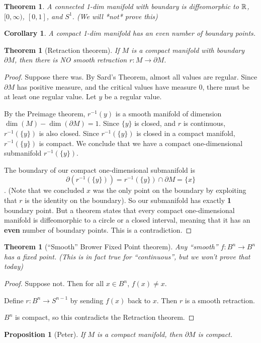 \documentclass[11pt]{amsbook}
\theoremstyle{mystyle} \newtheorem{thrm}[thm]{Theorem}
\theoremstyle{mystyle} \newtheorem{defi}[thm]{Definition}
\theoremstyle{mystyle} \newtheorem{coro}[thm]{Corollary}
\theoremstyle{mystyle} \newtheorem{propo}[thm]{Proposition}
\theoremstyle{mystyle} \newtheorem{lemm}[thm]{Lemma}
\numberwithin{thm}{section}
\renewcommand{\d}{\partial}
\newcommand{\oo}{\infty}
\begin{document}
\begin{thrm}
	A connected 1-dim manifold with boundary is diffeomorphic to ${\mathbb R}$, $[0,\oo)$, $[0,1]$, and $S^1$.  (We will *not* prove this)
\end{thrm}
\begin{coro}
	A compact 1-dim manifold has an even number of boundary points.
\end{coro}
\begin{thrm}[Retraction theorem]
	If $M$ is a compact manifold with boundary $\d M$, then there is NO smooth retraction $r : M \to \d M$.
\end{thrm}
\begin{proof}
	Suppose there was.  By Sard's Theorem, almost all values are regular.  Since $\d M$ has positive measure, and the critical values have measure 0, there must be at least one regular value.  Let $y$ be a regular value.

	By the Preimage theorem, $r^{-1}(y)$ is a smooth manifold of dimension $\dim(M) - \dim(\d M) = 1$.  Since $\{y\}$ is closed, and $r$ is continuous, $r^{-1}(\{y\})$ is also closed.  Since $r^{-1}(\{y\})$ is closed in a compact manifold, $r^{-1}(\{y\})$ is compact.  We conclude that we have a compact one-dimensional submanifold $r^{-1}(\{y\})$.

	The boundary of our compact one-dimensional submanifold is $$\d (r ^{-1}(\{y\})) = r^{-1}(\{y\}) \cap \d M = \{x\}$$.  (Note that we concluded $x$ was the only point on the boundary by exploiting that $r$ is the identity on the boundary).   So our submanifold has exactly \textbf{1} boundary point.  But a theorem states that every compact one-dimensional manifold is diffeomorphic to a circle or a closed interval, meaning that it has an \textbf{even} number of boundary points.  This is a contradiction.
\end{proof}
\begin{thrm}[``Smooth'' Brower Fixed Point theorem]
	Any ``smooth'' $f : B^n \to B^n$ has a fixed point.  (This is in fact true for ``continuous'', but we won't prove that today)
\end{thrm}
\begin{proof}
	Suppose not.  Then for all $x \in B^n$, $f(x) \not= x$.

	Define $r : B^n \to S^{n-1}$ by sending $f(x)$ back to $x$.  Then $r$ is a smooth retraction.

	$B^n$ is compact, so this contradicts the Retraction theorem.
\end{proof}
\begin{propo}[Peter]
	If $M$ is a compact manifold, then $\d M$ is compact.
\end{propo}
\end{document}

